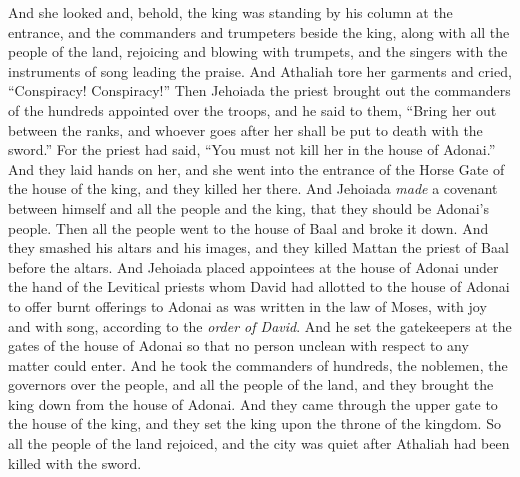 \begin{biblechapter}
\verse And she looked and, behold, the king was standing by his column at the entrance, and the commanders and trumpeters beside the king, along with all the people of the land, rejoicing and blowing with trumpets, and the singers with the instruments of song leading the praise. And Athaliah tore her garments and cried, “Conspiracy! Conspiracy!”
\verse Then Jehoiada the priest brought out the commanders of the hundreds appointed over the troops, and he said to them, “Bring her out between the ranks, and whoever goes after her shall be put to death with the sword.” For the priest had said, “You must not kill her in the house of Adonai.”
\verse And they laid hands on her, and she went into the entrance of the Horse Gate of the house of the king, and they killed her there.
\verse And Jehoiada \textit{made} a covenant between himself and all the people and the king, that they should be Adonai’s people.
\verse Then all the people went to the house of Baal and broke it down. And they smashed his altars and his images, and they killed Mattan the priest of Baal before the altars.
\verse And Jehoiada placed appointees at the house of Adonai under the hand of the Levitical priests whom David had allotted to the house of Adonai to offer burnt offerings to Adonai as was written in the law of Moses, with joy and with song, according to the \textit{order of David}.
\verse And he set the gatekeepers at the gates of the house of Adonai so that no person unclean with respect to any matter could enter.
\verse And he took the commanders of hundreds, the noblemen, the governors over the people, and all the people of the land, and they brought the king down from the house of Adonai. And they came through the upper gate to the house of the king, and they set the king upon the throne of the kingdom.
\verse So all the people of the land rejoiced, and the city was quiet after Athaliah had been killed with the sword.
\end{biblechapter}

